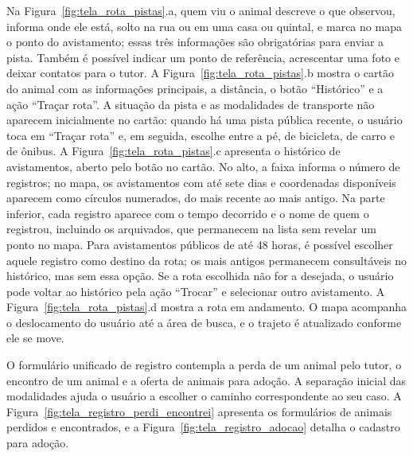Na Figura~\ref{fig:tela_rota_pistas}.a, quem viu o animal descreve o que observou, informa onde ele está, solto na rua ou em uma casa ou quintal, e marca no mapa o ponto do avistamento; essas três informações são obrigatórias para enviar a pista. Também é possível indicar um ponto de referência, acrescentar uma foto e deixar contatos para o tutor. A Figura~\ref{fig:tela_rota_pistas}.b mostra o cartão do animal com as informações principais, a distância, o botão ``Histórico'' e a ação ``Traçar rota''. A situação da pista e as modalidades de transporte não aparecem inicialmente no cartão: quando há uma pista pública recente, o usuário toca em ``Traçar rota'' e, em seguida, escolhe entre a pé, de bicicleta, de carro e de ônibus. A Figura~\ref{fig:tela_rota_pistas}.c apresenta o histórico de avistamentos, aberto pelo botão no cartão. No alto, a faixa informa o número de registros; no mapa, os avistamentos com até sete dias e coordenadas disponíveis aparecem como círculos numerados, do mais recente ao mais antigo. Na parte inferior, cada registro aparece com o tempo decorrido e o nome de quem o registrou, incluindo os arquivados, que permanecem na lista sem revelar um ponto no mapa. Para avistamentos públicos de até 48 horas, é possível escolher aquele registro como destino da rota; os mais antigos permanecem consultáveis no histórico, mas sem essa opção. Se a rota escolhida não for a desejada, o usuário pode voltar ao histórico pela ação ``Trocar'' e selecionar outro avistamento. A Figura~\ref{fig:tela_rota_pistas}.d mostra a rota em andamento. O mapa acompanha o deslocamento do usuário até a área de busca, e o trajeto é atualizado conforme ele se move.

O formulário unificado de registro contempla a perda de um animal pelo tutor, o encontro de um animal e a oferta de animais para adoção. A separação inicial das modalidades ajuda o usuário a escolher o caminho correspondente ao seu caso. A Figura~\ref{fig:tela_registro_perdi_encontrei} apresenta os formulários de animais perdidos e encontrados, e a Figura~\ref{fig:tela_registro_adocao} detalha o cadastro para adoção.

